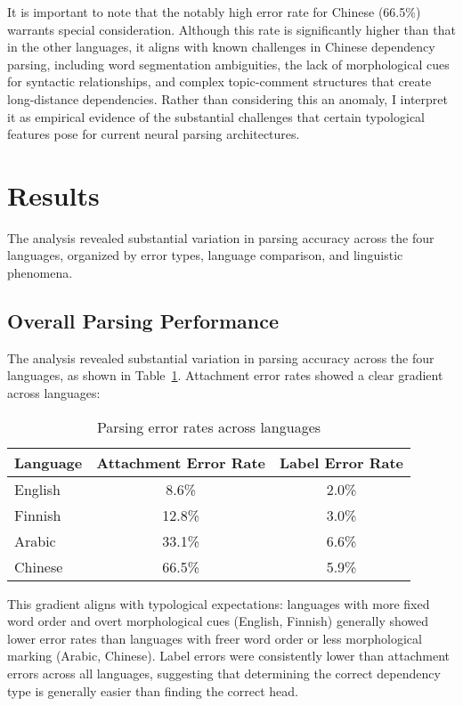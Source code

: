 \documentclass[11pt]{article}
\begin{document}
It is important to note that the notably high error rate for Chinese (66.5\%) warrants special consideration. Although this rate is significantly higher than that in the other languages, it aligns with known challenges in Chinese dependency parsing, including word segmentation ambiguities, the lack of morphological cues for syntactic relationships, and complex topic-comment structures that create long-distance dependencies. Rather than considering this an anomaly, I interpret it as empirical evidence of the substantial challenges that certain typological features pose for current neural parsing architectures.

\section{Results}

The analysis revealed substantial variation in parsing accuracy across the four languages, organized by error types, language comparison, and linguistic phenomena.

\subsection{Overall Parsing Performance}

The analysis revealed substantial variation in parsing accuracy across the four languages, as shown in Table~\ref{tab:error-rates}. Attachment error rates showed a clear gradient across languages:

\begin{table}[h]
\centering
\begin{tabular}{|l|c|c|}
\hline
\textbf{Language} & \textbf{Attachment Error Rate} & \textbf{Label Error Rate} \\
\hline
English & 8.6\% & 2.0\% \\
Finnish & 12.8\% & 3.0\% \\
Arabic & 33.1\% & 6.6\% \\
Chinese & 66.5\% & 5.9\% \\
\hline
\end{tabular}
\caption{Parsing error rates across languages}
\label{tab:error-rates}
\end{table}

This gradient aligns with typological expectations: languages with more fixed word order and overt morphological cues (English, Finnish) generally showed lower error rates than languages with freer word order or less morphological marking (Arabic, Chinese). Label errors were consistently lower than attachment errors across all languages, suggesting that determining the correct dependency type is generally easier than finding the correct head.
\end{document}
